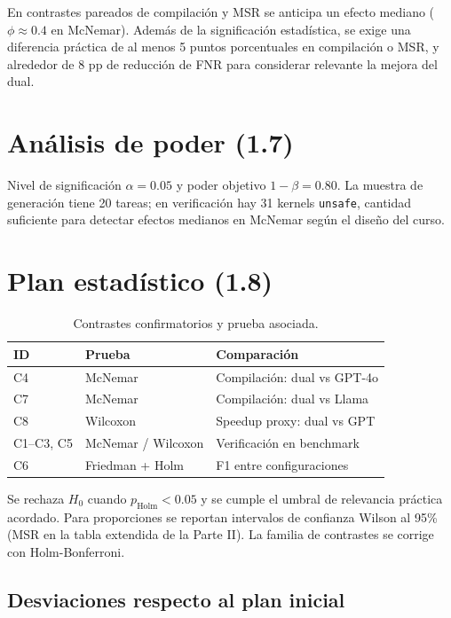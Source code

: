 En contrastes pareados de compilación y MSR se anticipa un efecto mediano ($\phi \approx 0.4$ en McNemar). Además de la significación estadística, se exige una diferencia práctica de al menos 5 puntos porcentuales en compilación o MSR, y alrededor de 8 pp de reducción de FNR para considerar relevante la mejora del dual.

\section{Análisis de poder (1.7)}

Nivel de significación $\alpha = 0.05$ y poder objetivo $1 - \beta = 0.80$. La muestra de generación tiene 20 tareas; en verificación hay 31 kernels \texttt{unsafe}, cantidad suficiente para detectar efectos medianos en McNemar según el diseño del curso.

\section{Plan estadístico (1.8)}

\begin{table}[ht]
\centering
\caption{Contrastes confirmatorios y prueba asociada.}
\label{tab:plan_stats}
\footnotesize
\begin{tabularx}{\linewidth}{@{}llX@{}}
\toprule
ID & Prueba & Comparación \\
\midrule
C4 & McNemar & Compilación: dual vs GPT-4o \\
C7 & McNemar & Compilación: dual vs Llama \\
C8 & Wilcoxon & Speedup proxy: dual vs GPT \\
C1--C3, C5 & McNemar / Wilcoxon & Verificación en benchmark \\
C6 & Friedman + Holm & F1 entre configuraciones \\
\bottomrule
\end{tabularx}
\end{table}

Se rechaza $H_0$ cuando $p_{\mathrm{Holm}} < 0.05$ y se cumple el umbral de relevancia práctica acordado. Para proporciones se reportan intervalos de confianza Wilson al 95\% (MSR en la tabla extendida de la Parte II). La familia de contrastes se corrige con Holm-Bonferroni.

\subsection{Desviaciones respecto al plan inicial}

